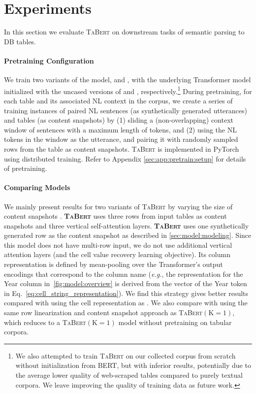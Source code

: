 \documentclass[11pt,a4paper]{article}
\def\model/{\textsc{TaBert}}
\def\modelbase/{}
\def\modellarge/{}
\def\bert/{}
\def\bertbase/{}
\def\bertlarge/{}
\newcommand{\CS}[1]{\ensuremath{\mathrm{(K=#1)}}}
\renewcommand{\tt}[1]{\fontfamily{cmtt}\selectfont #1}
\newcommand{\eg}{\hbox{\emph{e.g.}}\xspace}
\begin{document}
\section{Experiments}
\label{sec:exp}


In this section we evaluate \model/ on downstream tasks of semantic parsing to DB tables. 






\paragraph{Pretraining Configuration} 
We train two variants of the model, \modelbase/ and \modellarge/, with the underlying Transformer model initialized with the uncased versions of \bertbase/ and \bertlarge/, respectively.\footnote{We also attempted to train \model/ on our collected corpus from scratch without initialization from BERT, but with inferior results, potentially due to the average lower quality of web-scraped tables compared to purely textual corpora. We leave improving the quality of training data as future work.}
During pretraining, for each table and its associated NL context in the corpus, we create a series of training instances of paired NL sentences (as synthetically generated utterances) and tables (as content snapshots) by 
(1) sliding a (non-overlapping) context window of sentences with a maximum length of  tokens, and 
(2) using the NL tokens in the window as the utterance, and pairing it with randomly sampled rows from the table as content snapshots. 
\model/ is implemented in PyTorch using distributed training.
Refer to Appendix \autoref{sec:app:pretrain:setup} for details of pretraining.



\paragraph{Comparing Models} 
We mainly present results for two variants of \model/ by varying the size of content snapshots . 
\textbf{\model/} uses three rows from input tables as content snapshots and three vertical self-attention layers.
\textbf{\model/} uses one synthetically generated row as the content snapshot as described in \autoref{sec:model:modeling}. 
Since this model does not have multi-row input, we do not use additional vertical attention layers (and the cell value recovery learning objective). 
Its column representation  is defined by mean-pooling over the Transformer's output encodings that correspond to the column name (\eg, the representation for the {\tt Year} column in~\autoref{fig:model:overview} is derived from the vector of the {\tt Year} token in Eq.~\eqref{eq:cell_string_representation}).
We find this strategy gives better results compared with using the cell representation  as .
We also compare with \textbf{\bert/} using the same row linearization and content snapshot approach as \model/\CS{1}, which reduces to a \model/\CS{1} model without pretraining on tabular corpora. 
\end{document}
